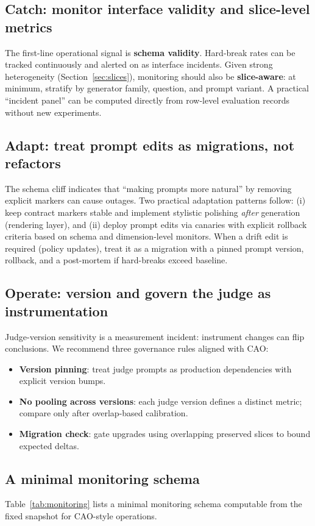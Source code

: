 \documentclass{article}
\begin{document}
\subsection{Catch: monitor interface validity and slice-level metrics}
The first-line operational signal is \textbf{schema validity}.
Hard-break rates can be tracked continuously and alerted on as interface incidents.
Given strong heterogeneity (Section~\ref{sec:slices}), monitoring should also be \textbf{slice-aware}:
at minimum, stratify by generator family, question, and prompt variant.
A practical ``incident panel'' can be computed directly from row-level evaluation records without new experiments.

\subsection{Adapt: treat prompt edits as migrations, not refactors}
The schema cliff indicates that ``making prompts more natural'' by removing explicit markers can cause outages.
Two practical adaptation patterns follow:
(i) keep contract markers stable and implement stylistic polishing \emph{after} generation (rendering layer), and
(ii) deploy prompt edits via canaries with explicit rollback criteria based on schema and dimension-level monitors.
When a drift edit is required (policy updates), treat it as a migration with a pinned prompt version, rollback, and a post-mortem if hard-breaks exceed baseline.

\subsection{Operate: version and govern the judge as instrumentation}
Judge-version sensitivity is a measurement incident: instrument changes can flip conclusions.
We recommend three governance rules aligned with CAO:
\begin{itemize}[leftmargin=1.2em, itemsep=2pt, topsep=2pt]
  \item \textbf{Version pinning}: treat judge prompts as production dependencies with explicit version bumps.
  \item \textbf{No pooling across versions}: each judge version defines a distinct metric; compare only after overlap-based calibration.
 \item \textbf{Migration check}: gate upgrades using overlapping preserved slices to bound expected deltas.
\end{itemize}

\subsection{A minimal monitoring schema}
Table~\ref{tab:monitoring} lists a minimal monitoring schema computable from the fixed snapshot for CAO-style operations.
 
\end{document}
